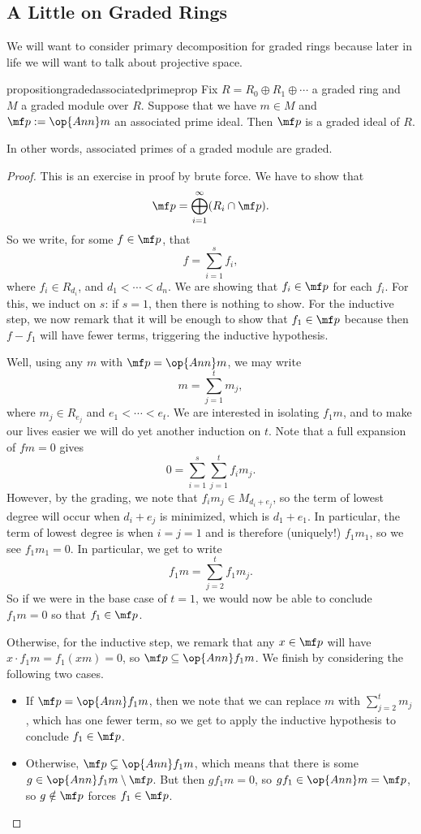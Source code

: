 \documentclass[../notes.tex]{subfiles}
\begin{document}
\subsection{A Little on Graded Rings}
We will want to consider primary decomposition for graded rings because later in life we will want to talk about projective space.
\begin{restatable}{proposition}{gradedassociatedprimeprop}
	Fix $R=R_0\oplus R_1\oplus\cdots$ a graded ring and $M$ a graded module over $R$. Suppose that we have $m\in M$ and $\mf p:=\op{Ann}m$ an associated prime ideal. Then $\mf p$ is a graded ideal of $R$.
\end{restatable}
\noindent In other words, associated primes of a graded module are graded.
\begin{proof}
	This is an exercise in proof by brute force. We have to show that
	\[\mf p=\bigoplus_{i=1}^\infty(R_i\cap\mf p).\]
	So we write, for some $f\in\mf p$, that
	\[f=\sum_{i=1}^sf_i,\]
	where $f_i\in R_{d_i}$, and $d_1<\cdots<d_n$. We are showing that $f_i\in\mf p$ for each $f_i$. For this, we induct on $s$: if $s=1$, then there is nothing to show. For the inductive step, we now remark that it will be enough to show that $f_1\in\mf p$ because then $f-f_1$ will have fewer terms, triggering the inductive hypothesis.
	
	Well, using any $m$ with $\mf p=\op{Ann}m$, we may write
	\[m=\sum_{j=1}^tm_j,\]
	where $m_j\in R_{e_j}$ and $e_1<\cdots<e_t$. We are interested in isolating $f_1m$, and to make our lives easier we will do yet another induction on $t$. Note that a full expansion of $fm=0$ gives
	\[0=\sum_{i=1}^s\sum_{j=1}^tf_im_j.\]
	However, by the grading, we note that $f_im_j\in M_{d_i+e_j}$, so the term of lowest degree will occur when $d_i+e_j$ is minimized, which is $d_1+e_1$. In particular, the term of lowest degree is when $i=j=1$ and is therefore (uniquely!) $f_1m_1$, so we see $f_1m_1=0$. In particular, we get to write
	\[f_1m=\sum_{j=2}^tf_1m_j.\]
	So if we were in the base case of $t=1$, we would now be able to conclude $f_1m=0$ so that $f_1\in\mf p$.
	
	Otherwise, for the inductive step, we remark that any $x\in\mf p$ will have $x\cdot f_1m=f_1(xm)=0$, so $\mf p\subseteq\op{Ann}f_1m$. We finish by considering the following two cases.
	\begin{itemize}
		\item If $\mf p=\op{Ann}f_1m$, then we note that we can replace $m$ with $\sum_{j=2}^tm_j$, which has one fewer term, so we get to apply the inductive hypothesis to conclude $f_1\in\mf p$.
		\item Otherwise, $\mf p\subsetneq\op{Ann}f_1m$, which means that there is some $g\in\op{Ann}f_1m\setminus\mf p$. But then $gf_1m=0$, so $gf_1\in\op{Ann}m=\mf p$, so $g\notin\mf p$ forces $f_1\in\mf p$.
		\qedhere
	\end{itemize}
\end{proof}
\end{document}
